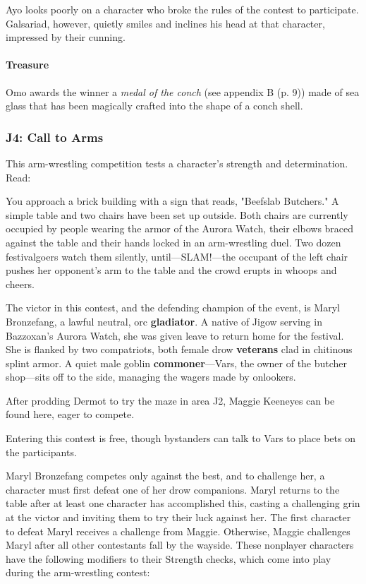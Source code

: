 \documentclass[a4paper, 11pt, bg=full, twocolumn, nooutline]{dndbook}
\begin{document}
Ayo looks poorly on a character who broke the rules of the contest to participate. Galsariad, however, quietly smiles and inclines his head at that character, impressed by their cunning.

\paragraph{Treasure}

Omo awards the winner a \textit{medal of the conch} (see appendix B (p. 9)) made of sea glass that has been magically crafted into the shape of a conch shell.

\subsubsection{J4: Call to Arms}

This arm-wrestling competition tests a character's strength and determination. Read:

\begin{DndReadAloud}
You approach a brick building with a sign that reads, "Beefslab Butchers." A simple table and two chairs have been set up outside. Both chairs are currently occupied by people wearing the armor of the Aurora Watch, their elbows braced against the table and their hands locked in an arm-wrestling duel. Two dozen festivalgoers watch them silently, until---SLAM!---the occupant of the left chair pushes her opponent's arm to the table and the crowd erupts in whoops and cheers.
\end{DndReadAloud}

The victor in this contest, and the defending champion of the event, is Maryl Bronzefang, a lawful neutral, orc \textbf{gladiator}. A native of Jigow serving in Bazzoxan's Aurora Watch, she was given leave to return home for the festival. She is flanked by two compatriots, both female drow \textbf{veterans} clad in chitinous splint armor. A quiet male goblin \textbf{commoner}---Vars, the owner of the butcher shop---sits off to the side, managing the wagers made by onlookers.

After prodding Dermot to try the maze in area J2, Maggie Keeneyes can be found here, eager to compete.

Entering this contest is free, though bystanders can talk to Vars to place bets on the participants.

Maryl Bronzefang competes only against the best, and to challenge her, a character must first defeat one of her drow companions. Maryl returns to the table after at least one character has accomplished this, casting a challenging grin at the victor and inviting them to try their luck against her. The first character to defeat Maryl receives a challenge from Maggie. Otherwise, Maggie challenges Maryl after all other contestants fall by the wayside. These nonplayer characters have the following modifiers to their Strength checks, which come into play during the arm-wrestling contest:
\end{document}
